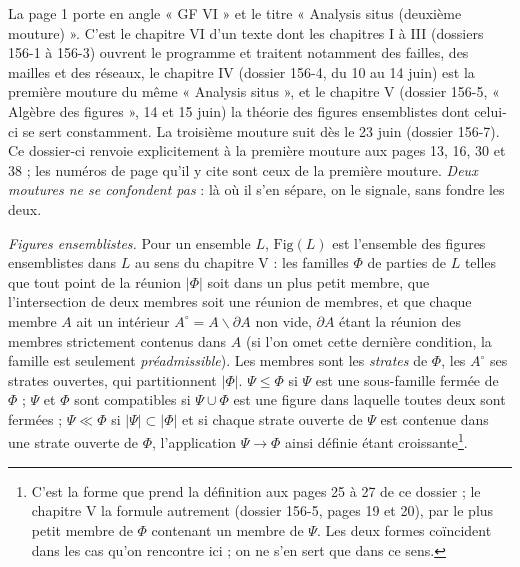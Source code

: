 \documentclass[11pt,a4paper]{article}
\begin{document}
La page 1 porte en angle « GF VI » et le titre « Analysis situs (deuxième
mouture) ». C'est le chapitre VI d'un texte dont les chapitres I à III
(dossiers 156-1 à 156-3) ouvrent le programme et traitent notamment des failles,
des mailles et des réseaux, le
chapitre IV (dossier 156-4, du 10 au 14 juin) est la première mouture du même
« Analysis situs », et le chapitre V (dossier 156-5, « Algèbre des figures »,
14 et 15 juin) la théorie des figures ensemblistes dont celui-ci se sert
constamment. La troisième mouture suit dès le 23 juin (dossier 156-7). Ce
dossier-ci renvoie explicitement à la première mouture aux pages 13, 16, 30
et 38 ; les numéros de page qu'il y cite sont ceux de la première mouture. \emph{Deux moutures ne se
confondent pas} : là où il s'en sépare, on le signale, sans fondre les deux.

\emph{Figures ensemblistes.} Pour un ensemble $L$, $\mathrm{Fig}(L)$ est
l'ensemble des figures ensemblistes dans $L$ au sens du chapitre V : les
familles $\Phi$ de parties de $L$ telles que tout point de la réunion $|\Phi|$
soit dans un plus petit membre, que l'intersection de deux membres soit une
réunion de membres, et que chaque membre $A$ ait un intérieur $A^{\circ} = A
\smallsetminus \partial A$ non vide, $\partial A$ étant la réunion des membres
strictement contenus dans $A$ (si l'on omet cette dernière condition, la
famille est seulement \emph{préadmissible}). Les membres sont les \emph{strates}
de $\Phi$, les $A^{\circ}$ ses strates ouvertes, qui partitionnent $|\Phi|$.
$\Psi \leq \Phi$ si $\Psi$ est une sous-famille fermée de $\Phi$ ; $\Psi$ et
$\Phi$ sont compatibles si $\Psi \cup \Phi$ est une figure dans laquelle toutes
deux sont fermées ; $\Psi \ll \Phi$ si $|\Psi| \subset |\Phi|$ et si chaque
strate ouverte de $\Psi$ est contenue dans une strate ouverte de $\Phi$,
l'application $\Psi \to \Phi$ ainsi définie étant croissante\footnote{C'est la
forme que prend la définition aux pages 25 à 27 de ce dossier ; le chapitre V la
formule autrement (dossier 156-5, pages 19 et 20), par le plus petit membre de
$\Phi$ contenant un membre de $\Psi$. Les deux formes coïncident dans les cas
qu'on rencontre ici ; on ne s'en sert que dans ce sens.}.
\end{document}
